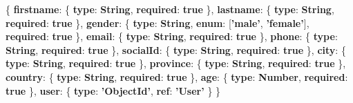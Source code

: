 \documentclass[
]{article}
\newenvironment{Shaded}{}{}
\newcommand{\ErrorTok}[1]{\textcolor[rgb]{1.00,0.00,0.00}{\textbf{#1}}}
\newcommand{\FunctionTok}[1]{\textcolor[rgb]{0.02,0.16,0.49}{#1}}
\newcommand{\KeywordTok}[1]{\textcolor[rgb]{0.00,0.44,0.13}{\textbf{#1}}}
\newcommand{\OtherTok}[1]{\textcolor[rgb]{0.00,0.44,0.13}{#1}}
\begin{document}
\begin{Shaded}
\begin{Highlighting}[]
\FunctionTok{\{}
    \ErrorTok{firstname}\FunctionTok{:} \FunctionTok{\{}
        \ErrorTok{type}\FunctionTok{:} \ErrorTok{String}\FunctionTok{,}
        \ErrorTok{required}\FunctionTok{:} \KeywordTok{true}
    \FunctionTok{\},}
    \ErrorTok{lastname}\FunctionTok{:} \FunctionTok{\{}
        \ErrorTok{type}\FunctionTok{:} \ErrorTok{String}\FunctionTok{,}
        \ErrorTok{required}\FunctionTok{:} \KeywordTok{true}
    \FunctionTok{\},}
    \ErrorTok{gender}\FunctionTok{:} \FunctionTok{\{}
        \ErrorTok{type}\FunctionTok{:} \ErrorTok{String}\FunctionTok{,}
        \ErrorTok{enum}\FunctionTok{:} \OtherTok{[}\ErrorTok{'male'}\OtherTok{,} \ErrorTok{'female'}\OtherTok{]}\FunctionTok{,}
        \ErrorTok{required}\FunctionTok{:} \KeywordTok{true}
    \FunctionTok{\},}
    \ErrorTok{email}\FunctionTok{:} \FunctionTok{\{}
        \ErrorTok{type}\FunctionTok{:} \ErrorTok{String}\FunctionTok{,}
        \ErrorTok{required}\FunctionTok{:} \KeywordTok{true}
    \FunctionTok{\},}
    \ErrorTok{phone}\FunctionTok{:} \FunctionTok{\{}
        \ErrorTok{type}\FunctionTok{:} \ErrorTok{String}\FunctionTok{,}
        \ErrorTok{required}\FunctionTok{:} \KeywordTok{true}
    \FunctionTok{\},}
    \ErrorTok{socialId}\FunctionTok{:} \FunctionTok{\{}
        \ErrorTok{type}\FunctionTok{:} \ErrorTok{String}\FunctionTok{,}
        \ErrorTok{required}\FunctionTok{:} \KeywordTok{true}
    \FunctionTok{\},}
    \ErrorTok{city}\FunctionTok{:} \FunctionTok{\{}
        \ErrorTok{type}\FunctionTok{:} \ErrorTok{String}\FunctionTok{,}
        \ErrorTok{required}\FunctionTok{:} \KeywordTok{true}
    \FunctionTok{\},}
    \ErrorTok{province}\FunctionTok{:} \FunctionTok{\{}
        \ErrorTok{type}\FunctionTok{:} \ErrorTok{String}\FunctionTok{,}
        \ErrorTok{required}\FunctionTok{:} \KeywordTok{true}
    \FunctionTok{\},}
    \ErrorTok{country}\FunctionTok{:} \FunctionTok{\{}
        \ErrorTok{type}\FunctionTok{:} \ErrorTok{String}\FunctionTok{,}
        \ErrorTok{required}\FunctionTok{:} \KeywordTok{true}
    \FunctionTok{\},}
    \ErrorTok{age}\FunctionTok{:} \FunctionTok{\{}
        \ErrorTok{type}\FunctionTok{:} \ErrorTok{Number}\FunctionTok{,}
        \ErrorTok{required}\FunctionTok{:} \KeywordTok{true}
    \FunctionTok{\},}
    \ErrorTok{user}\FunctionTok{:} \FunctionTok{\{}
        \ErrorTok{type}\FunctionTok{:} \ErrorTok{'ObjectId'}\FunctionTok{,}
        \ErrorTok{ref}\FunctionTok{:} \ErrorTok{'User'}
    \FunctionTok{\}}
\FunctionTok{\}}
\end{Highlighting}
\end{Shaded}
\end{document}
